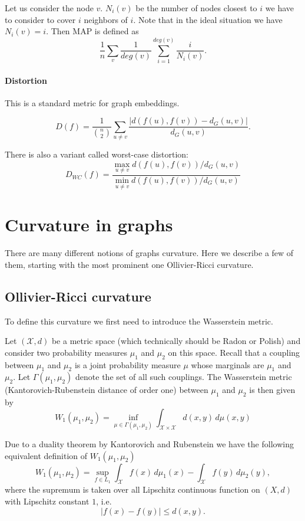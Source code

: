 \documentclass{article}
\begin{document}
Let us consider the node $v$. $N_i(v)$ be the number of nodes closest to $i$ we have to consider to cover $i$ neighbors of $i$. Note that in the ideal situation we have $N_i(v) = i$. Then MAP is defined as 
\[
\frac{1}{n} \sum_v \frac{1}{deg(v)} \sum_{i=1}^{deg(v)} \frac{i}{N_i(v)}. 
\]

\paragraph{Distortion} This is a standard metric for graph embeddings.

\[
D(f) = \frac{1}{\binom{n}{2}} \sum_{u \neq v}  \frac{|d(f(u),f(v)) - d_G(u,v)|}{d_G(u,v)}.
\]

There is also a variant called worst-case distortion:
\[
D_{WC}(f) = \frac{\max_{u\neq v}d(f(u),f(v))/d_G(u,v)}{\min_{u\neq v}d(f(u),f(v))/d_G(u,v)} 
\]

\section{Curvature in graphs}

There are many different notions of graphs curvature. Here we describe a few of them, starting with the most prominent one Ollivier-Ricci curvature.

\subsection{Ollivier-Ricci curvature}

To define this curvature we first need to introduce the Wasserstein metric.

Let $(\mathcal{X},d)$ be a metric space (which technically should be Radon or Polish) and consider two probability measures $\mu_1$ and $\mu_2$ on this space. Recall that a coupling between $\mu_1$ and $\mu_2$ is a joint probability measure $\mu$ whose marginals are $\mu_1$ and $\mu_2$. Let $\Gamma(\mu_1, \mu_2)$ denote the set of all such couplings. The Wasserstein metric (Kantorovich-Rubenstein distance of order one) between $\mu_1$ and $\mu_2$ is then given by
\begin{equation}\label{eq:def_wasserstein_inf}
	W_1(\mu_1, \mu_2) = \inf_{\mu \in \Gamma(\mu_1, \mu_2)} \int_{\mathcal{X} \times \mathcal{X}} d(x,y) \, d\mu(x,y)
\end{equation}

Due to a duality theorem by Kantorovich and Rubenstein we have the following equivalent definition of $W_1(\mu_1, \mu_2)$
\begin{equation}\label{eq:def_wasserstein_sup}
	W_1(\mu_1, \mu_2) = \sup_{f \in L_1} \int_\mathcal{X} f(x) \, d\mu_1(x) - \int_\mathcal{X} f(y) \, d\mu_2(y),
\end{equation}
where the supremum is taken over all Lipschitz continuous function on $(X,d)$ with Lipschitz constant $1$, i.e.
\[
	|f(x) - f(y)| \le d(x,y).
\]
\end{document}
